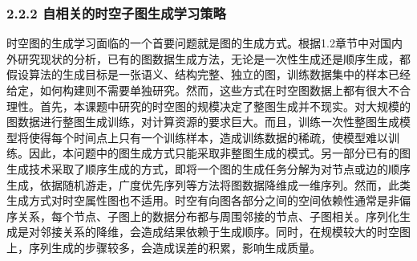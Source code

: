 \documentclass[12pt,UTF8,AutoFakeBold=2,a4paper]{ctexart} %
\begin{document}
%
%
%
%
%
%
\subsubsection{2.2.2 自相关的时空子图生成学习策略}
时空图的生成学习面临的一个首要问题就是图的生成方式。根据1.2章节中对国内外研究现状的分析，已有的图数据生成方法，无论是一次性生成还是顺序生成，都假设算法的生成目标是一张语义、结构完整、独立的图，训练数据集中的样本已经给定，如何构建则不需要单独研究。然而，这些方式在时空图数据上都有很大不合理性。首先，本课题中研究的时空图的规模决定了整图生成并不现实。对大规模的图数据进行整图生成训练，对计算资源的要求巨大。而且，训练一次性整图生成模型将使得每个时间点上只有一个训练样本，造成训练数据的稀疏，使模型难以训练。因此，本问题中的图生成方式只能采取非整图生成的模式。另一部分已有的图生成技术采取了顺序生成的方式，即将一个图的生成任务分解为对节点或边的顺序生成，依据随机游走，广度优先序列等方法将图数据降维成一维序列。然而，此类生成方式对时空属性图也不适用。时空有向图各部分之间的空间依赖性通常是非偏序关系，每个节点、子图上的数据分布都与周围邻接的节点、子图相关。序列化生成是对邻接关系的降维，会造成结果依赖于生成顺序。同时，在规模较大的时空图上，序列生成的步骤较多，会造成误差的积累，影响生成质量。
\end{document}
